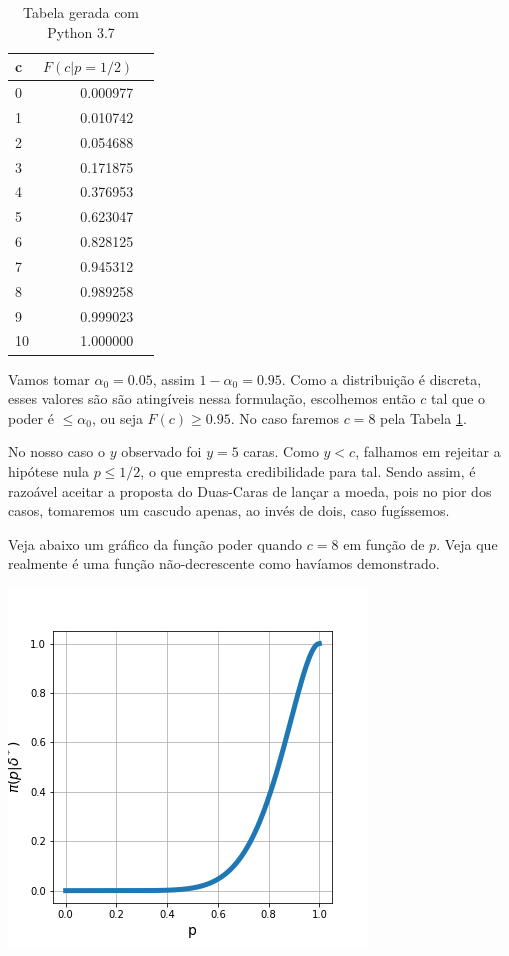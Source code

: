 \documentclass[a4paper,10pt, notitlepage]{report}
\begin{document}
\begin{enumerate}
\begin{table}[!htb]
\begin{center}
		\begin{tabular}{lrr}
			\toprule
			{c} &     $F(c|p=1/2)$ \\
			\midrule
			0  &     0.000977 \\
			1  &    0.010742 \\
			2  &      0.054688 \\
			3  &     0.171875 \\
			4  &     0.376953 \\
			5  &     0.623047 \\
			6  &     0.828125 \\
			7  &     0.945312 \\
			8  &     0.989258 \\
			9  &     0.999023 \\
			10 &     1.000000 \\
			\bottomrule
		\end{tabular}
	
	\caption{Tabela gerada com Python 3.7}
		\label{tabela}
	\end{center}
	\end{table}
		
		
	Vamos tomar $\alpha_0=0.05$, assim $1-\alpha_0=0.95$. Como a distribuição é discreta, esses valores são são atingíveis nessa formulação, escolhemos então $c$ tal que o poder é $\leq\alpha_0$, ou seja $F(c)\geq 0.95$. No caso faremos $c=8$ pela Tabela \ref{tabela}.
	
	No nosso caso o $y$ observado foi $y=5$ caras. Como $y<c$, falhamos em rejeitar a hipótese nula $p\leq 1/2$, o que empresta credibilidade para tal. Sendo assim, é razoável aceitar a proposta do Duas-Caras de lançar a moeda, pois no pior dos casos, tomaremos um cascudo apenas, ao invés de dois, caso fugíssemos.
	
	Veja abaixo um gráfico da função poder quando $c=8$ em função de $p$. Veja que realmente é uma função não-decrescente como havíamos demonstrado.
	
	\begin{center}
		\includegraphics[scale=1]{power.png}
	\end{center}
	

\end{enumerate}
\end{document}

